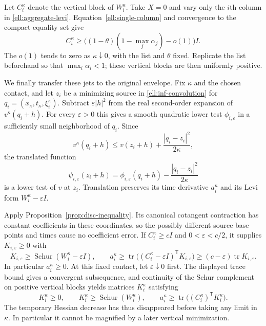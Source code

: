 \documentclass[11pt]{article}
\theoremstyle{definition}
\theoremstyle{remark}
\DeclareMathOperator{\tr}{tr}
\DeclareMathOperator{\Schur}{Schur}
\numberwithin{equation}{section}
\begin{document}
Let $C_i^\kappa$ denote the vertical block of $W_i^\kappa$.
Take $X=0$ and vary only the $i$th column in
\eqref{ell:aggregate-levi}.  Equation~\eqref{ell:single-column}
and convergence to the compact equality set give
\begin{equation}\label{ell:vertical-positive}
 C_i^\kappa\ge
 \bigl((1-\theta)(1-\max_j\alpha_j)-o(1)\bigr)I.
\end{equation}
The $o(1)$ tends to zero as $\kappa\downarrow0$, with the list and
$\theta$ fixed.  Replicate the list beforehand so that
$\max_i\alpha_i<1$; these vertical blocks are then uniformly positive.

We finally transfer these jets to the original envelope.  Fix
$\kappa$ and the chosen contact, and let $z_i$ be a minimizing source
in \eqref{ell:inf-convolution} for
$q_i=(x_\kappa,t_\kappa,\xi_i^\kappa)$.
Subtract $\varepsilon|h|^2$ from the real second-order expansion of
$v^\kappa(q_i+h)$.  For every $\varepsilon>0$ this gives a smooth
quadratic lower test $\phi_{i,\varepsilon}$ in a sufficiently small
neighborhood of $q_i$.  Since
\[
 v^\kappa(q_i+h)
 \le v(z_i+h)+\frac{|q_i-z_i|^2}{2\kappa},
\]
the translated function
\begin{equation}\label{ell:translated-test}
 \psi_{i,\varepsilon}(z_i+h)
 =\phi_{i,\varepsilon}(q_i+h)
       -\frac{|q_i-z_i|^2}{2\kappa}
\end{equation}
is a lower test of $v$ at $z_i$.  Translation preserves its time
derivative $a_i^\kappa$ and its Levi form
$W_i^\kappa-\varepsilon I$.

Apply Proposition~\ref{prop:disc-inequality}.  Its canonical
cotangent contraction has constant coefficients in these coordinates,
so the possibly different source base points and times cause no
coefficient error.  If $C_i^\kappa\ge cI$ and $0<\varepsilon<c/2$,
it supplies $K_{i,\varepsilon}\ge0$ with
\[
 K_{i,\varepsilon}\ge\Schur(W_i^\kappa-\varepsilon I),
 \qquad
 a_i^\kappa\ge
 \tr\bigl((C_i^\kappa-\varepsilon I)^{\mathsf T}
                  K_{i,\varepsilon}\bigr)
 \ge(c-\varepsilon)\tr K_{i,\varepsilon}.
\]
In particular $a_i^\kappa\ge0$.  At this fixed contact, let
$\varepsilon\downarrow0$ first.  The displayed trace bound gives a
convergent subsequence, and continuity of the Schur complement on
positive vertical blocks yields matrices $K_i^\kappa$ satisfying
\begin{equation}\label{ell:transferred-inequality}
 K_i^\kappa\ge0,\qquad
 K_i^\kappa\ge\Schur(W_i^\kappa),\qquad
 a_i^\kappa\ge\tr\bigl((C_i^\kappa)^{\mathsf T}K_i^\kappa\bigr).
\end{equation}
The temporary Hessian decrease has thus disappeared before taking
any limit in $\kappa$.  In particular it cannot be magnified by a
later vertical minimization.
\end{document}

